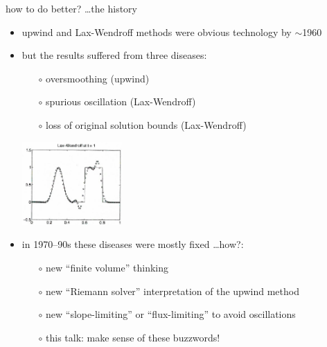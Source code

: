\documentclass[10pt,dvipsnames,usepdftitle=false,
hyperref={pdftitle = {Finite volume methods},
    pdfauthor = {Ed Bueler}}]{beamer}
\newcommand{\Matlab}{\textsc{Matlab}\xspace}
\begin{document}
\begin{frame}{how to do better? \dots the history}

\begin{itemize}
\item upwind and Lax-Wendroff methods were obvious technology by $\sim$1960
\item but the results suffered from three diseases:
    \begin{itemize}
    \item[$\circ$] \alert{oversmoothing} (upwind)
    \item[$\circ$] \alert{spurious oscillation} (Lax-Wendroff)
    \item[$\circ$] \alert{loss of original solution bounds} (Lax-Wendroff)
    \end{itemize}

\vspace{-15mm}

\hfill \includegraphics[width=0.3\textwidth]{figs/leveque6p1lw}

\bigskip
\item in 1970--90s these diseases were mostly fixed \dots how?:
    \begin{itemize}
    \item[$\circ$] new ``finite volume'' thinking
    \item[$\circ$] new ``Riemann solver'' interpretation of the upwind method
    \item[$\circ$] new ``slope-limiting'' or ``flux-limiting'' to avoid oscillations
    \item[$\circ$] this talk: make sense of these buzzwords!
    \end{itemize}
\end{itemize}
\end{frame}


\end{document}
